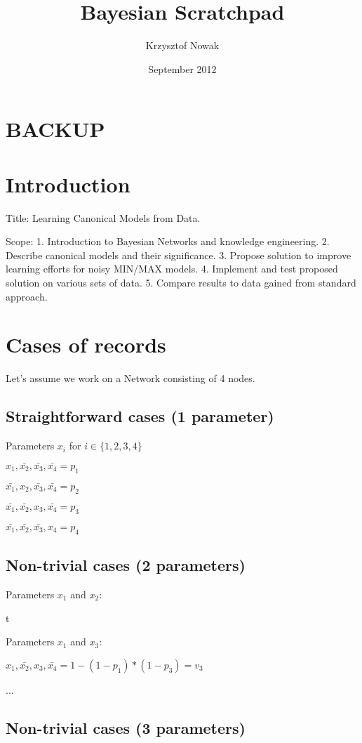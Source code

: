 \documentclass{article}
\title{Bayesian Scratchpad}
\author{Krzysztof Nowak}
\date{September 2012}
\begin{document}
\maketitle
\section{BACKUP}
\section{Introduction}
Title: Learning Canonical Models from Data.

Scope:
1. Introduction to Bayesian Networks and knowledge engineering.
2. Describe canonical models and their significance.
3. Propose solution to improve learning efforts for noisy MIN/MAX models.
4. Implement and test proposed solution on various sets of data.
5. Compare results to data gained from standard approach.

\section{Cases of records}
Let's assume we work on a Network consisting of 4 nodes.
\subsection{Straightforward cases (1 parameter)}
Parameters $x_i$ for $i \in \{1,2,3,4\}$

$     x_1,  \bar{x_2}, \bar{x_3}, \bar{x_4} = p_1$

$\bar{x_1},      x_2,  \bar{x_3}, \bar{x_4} = p_2$

$\bar{x_1}, \bar{x_2},      x_3,  \bar{x_4} = p_3$

$\bar{x_1}, \bar{x_2}, \bar{x_3},      x_4  = p_4$


\subsection{Non-trivial cases (2 parameters)}

Parameters $x_1$ and $x_2$:

t

Parameters $x_1$ and $x_3$:

$     x_1,  \bar{x_2},     x_3,  \bar{x_4} = 1-(1-p_1)*(1-p_3) = v_3$

...

\subsection{Non-trivial cases (3 parameters)}
\end{document}
